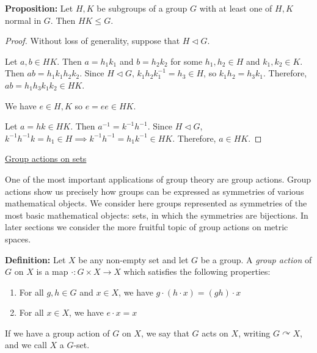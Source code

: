 \documentclass[12pt]{article}
\newcommand{\vs}{\vskip10pt}
\begin{document}
	\vs 
	
	\textbf{Proposition: } Let $H,K$ be subgroups of a group $G$ with at least one of $H,K$ normal in $G$. Then $HK \leq G$. 
	
	\begin{proof}
		
		Without loss of generality, suppose that $H \triangleleft G$.
		
		\vs
		
		 Let $a,b \in HK$. Then $a = h_1 k_1$ and $b = h_2 k_2$ for some $h_1, h_2 \in H$ and $k_1, k_2 \in K$. Then $ab = h_1 k_1 h_2 k_2$. Since $H \triangleleft G$, $k_1 h_2 k_1^{-1} = h_3 \in H$, so $k_1 h_2 = h_3 k_1$. Therefore, $ab = h_1 h_3 k_1 k_2 \in HK$. 
		
		\vs 
		
		We have $e \in H,K$ so $e = ee \in HK$.
		
		\vs 
		
		Let $a = hk \in HK$. Then $a^{-1} = k^{-1}h^{-1}$. Since $H \triangleleft G$, $k^{-1} h^{-1} k = h_1 \in H \implies k^{-1} h^{-1} = h_1 k^{-1} \in HK$. Therefore, $a \in HK$.
		
	\end{proof}
	
	\underline{Group actions on sets}
	
	\vs 
	
	One of the most important applications of group theory are group actions. Group actions show us precisely how groups can be expressed as symmetries of various mathematical objects. We consider here groups represented as symmetries of the most basic mathematical objects: sets, in which the symmetries are bijections. In later sections we consider the more fruitful topic of group actions on metric spaces. 
	
	\vs 
	
	\textbf{Definition: } Let $X$ be any non-empty set and let $G$ be a group. A \textit{group action} of $G$ on $X$ is a map $\cdot: G \times X \rightarrow X$ which satisfies the following properties: 
	
	\begin{enumerate}[label = (\roman*)]
		\item For all $g,h \in G$ and $x \in X$, we have $g \cdot (h \cdot x) = (gh) \cdot x$
		\item For all $x \in X$, we have $e \cdot x = x$
	\end{enumerate}
	
	If we have a group action of $G$ on $X$, we say that $G$ acts on $X$, writing $G \curvearrowright X$, and we call $X$ a $G$-set. 
	
\end{document}
